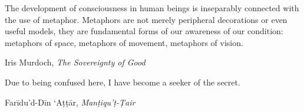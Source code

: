 \epigraph{The development of consciousness in human beings is inseparably connected with the use of metaphor. Metaphors are not merely peripheral decorations or even useful models, they are fundamental forms of our awareness of our condition: metaphors of space, metaphors of movement, metaphors of vision.}{Iris Murdoch, \emph{The Sovereignty of Good}}
\epigraph{Due to being confused here, I have become a seeker of the secret.}{Farīdu'd-Dīn `Aṭṭār, \emph{Manṭiqu'ṭ-Ṭair}}